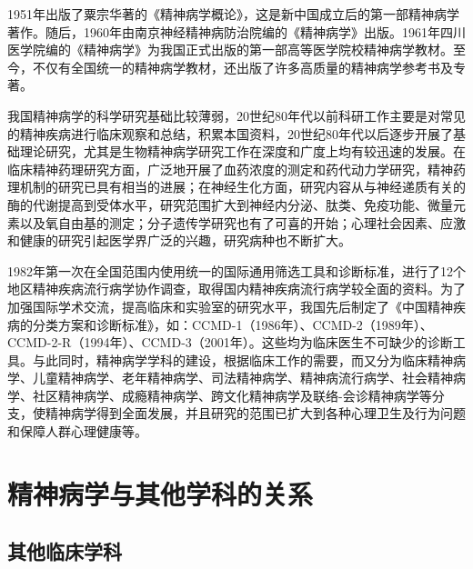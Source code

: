 1951年出版了粟宗华著的《精神病学概论》，这是新中国成立后的第一部精神病学著作。随后，1960年由南京神经精神病防治院编的《精神病学》出版。1961年四川医学院编的《精神病学》为我国正式出版的第一部高等医学院校精神病学教材。至今，不仅有全国统一的精神病学教材，还出版了许多高质量的精神病学参考书及专著。

我国精神病学的科学研究基础比较薄弱，20世纪80年代以前科研工作主要是对常见的精神疾病进行临床观察和总结，积累本国资料，20世纪80年代以后逐步开展了基础理论研究，尤其是生物精神病学研究工作在深度和广度上均有较迅速的发展。在临床精神药理研究方面，广泛地开展了血药浓度的测定和药代动力学研究，精神药理机制的研究已具有相当的进展；在神经生化方面，研究内容从与神经递质有关的酶的代谢提高到受体水平，研究范围扩大到神经内分泌、肽类、免疫功能、微量元素以及氧自由基的测定；分子遗传学研究也有了可喜的开始；心理社会因素、应激和健康的研究引起医学界广泛的兴趣，研究病种也不断扩大。

1982年第一次在全国范围内使用统一的国际通用筛选工具和诊断标准，进行了12个地区精神疾病流行病学协作调查，取得国内精神疾病流行病学较全面的资料。为了加强国际学术交流，提高临床和实验室的研究水平，我国先后制定了《中国精神疾病的分类方案和诊断标准》，如：CCMD-1（1986年）、CCMD-2（1989年）、CCMD-2-R（1994年）、CCMD-3（2001年）。这些均为临床医生不可缺少的诊断工具。与此同时，精神病学学科的建设，根据临床工作的需要，而又分为临床精神病学、儿童精神病学、老年精神病学、司法精神病学、精神病流行病学、社会精神病学、社区精神病学、成瘾精神病学、跨文化精神病学及联络-会诊精神病学等分支，使精神病学得到全面发展，并且研究的范围已扩大到各种心理卫生及行为问题和保障人群心理健康等。

\section{精神病学与其他学科的关系}

\subsection{其他临床学科}

